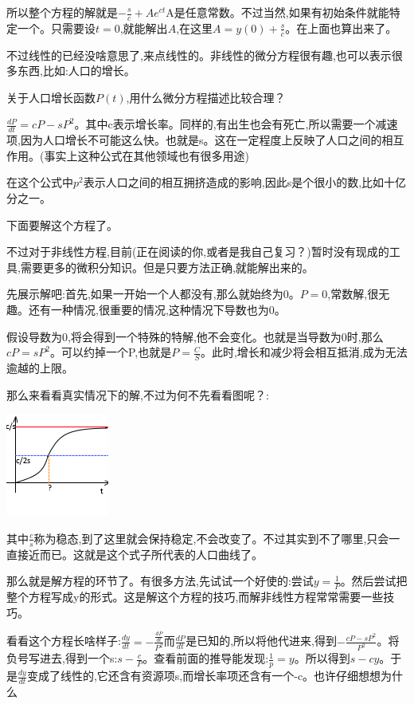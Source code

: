 \documentclass[UTF8]{ctexbook}
\begin{document}
{{{{  所以整个方程的解就是$-\frac{s}{c} + Ae^{ct}$A是任意常数。不过当然,如果有初始条件就能特定一个。只需要设$t = 0$,就能解出$A$,在这里$A = y(0) + \frac{s}{c}$。在上面也算出来了。

  不过线性的已经没啥意思了,来点线性的。非线性的微分方程很有趣,也可以表示很多东西,比如:人口的增长。

  关于人口增长函数$P(t)$,用什么微分方程描述比较合理？

  $\frac{dP}{dt} = cP - sP^2$。其中c表示增长率。同样的,有出生也会有死亡,所以需要一个减速项,因为人口增长不可能这么快。也就是s。这在一定程度上反映了人口之间的相互作用。(事实上这种公式在其他领域也有很多用途)

  在这个公式中$p^2$表示人口之间的相互拥挤造成的影响,因此s是个很小的数,比如十亿分之一。

  下面要解这个方程了。

  不过对于非线性方程,目前(正在阅读的你,或者是我自己复习？)暂时没有现成的工具,需要更多的微积分知识。但是只要方法正确,就能解出来的。

  先展示解吧:首先,如果一开始一个人都没有,那么就始终为0。$P = 0$,常数解,很无趣。还有一种情况,很重要的情况,这种情况下导数也为0。

  假设导数为0,将会得到一个特殊的特解,他不会变化。也就是当导数为0时,那么$cP = sP^2$。可以约掉一个P,也就是$P = \frac{C}{S}$。此时,增长和减少将会相互抵消,成为无法逾越的上限。

  那么来看看真实情况下的解,不过为何不先看看图呢？:

  \includegraphics{resources/nonLinearDifferencialEquation_HumanGrow.png}

  其中$\frac{c}{s}$称为稳态,到了这里就会保持稳定,不会改变了。不过其实到不了哪里,只会一直接近而已。这就是这个式子所代表的人口曲线了。

  那么就是解方程的环节了。有很多方法,先试试一个好使的:尝试$y = \frac{1}{P}$。然后尝试把整个方程写成y的形式。这是解这个方程的技巧,而解非线性方程常常需要一些技巧。

  看看这个方程长啥样子:$\frac{dy}{dt} = -\frac{\frac{dP}{dt}}{P^2}$而$\frac{dP}{dt}$是已知的,所以将他代进来,得到$-\frac{cP - sP^2}{P^2}$。将负号写进去,得到一个s:$s - \frac{c}{P}$。查看前面的推导能发现:$\frac{1}{p} = y$。所以得到$s - cy$。于是$\frac{dy}{dt}$变成了线性的,它还含有资源项s,而增长率项还含有一个-c。也许仔细想想为什么

}}}}
\end{document}
